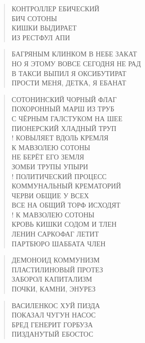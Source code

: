 \poemtitle{***}
\begin{verse}
КОНТРОЛЛЕР ЕБИЧЕСКИЙ\\
БИЧ СОТОНЫ\\
КИШКИ ВЫДИРАЕТ\\
ИЗ РЕСТФУЛ АПИ
\end{verse}

\poemtitle{***}
\begin{verse}
БАГРЯНЫМ КЛИНКОМ В НЕБЕ ЗАКАТ\\
НО Я ЭТОМУ ВОВСЕ СЕГОДНЯ НЕ РАД\\
В ТАКСИ ВЫПИЛ Я ОКСИБУТИРАТ\\
ПРОСТИ МЕНЯ, ДЕТКА, Я ЕБАНАТ
\end{verse}

\poemtitle{***}
\begin{verse}
СОТОНИНСКИЙ ЧОРНЫЙ ФЛАГ\\
ПОХОРОННЫЙ МАРШ ИЗ ТРУБ\\
С ЧЁРНЫМ ГАЛСТУКОМ НА ШЕЕ\\
ПИОНЕРСКИЙ ХЛАДНЫЙ ТРУП\\!
КОВЫЛЯЕТ ВДОЛЬ КРЕМЛЯ\\
К МАВЗОЛЕЮ СОТОНЫ\\
НЕ БЕРЁТ ЕГО ЗЕМЛЯ\\
ЗОМБИ ТРУПЫ УПЫРИ\\!
ПОЛИТИЧЕСКИЙ ПРОЦЕСС\\
КОММУНАЛЬНЫЙ КРЕМАТОРИЙ\\
ЧЕРВИ ОБЩИЕ У ВСЕХ\\
ВСЕ НА ОБЩИЙ ТОРФ ИСХОДЯТ\\!
К МАВЗОЛЕЮ СОТОНЫ\\
КРОВЬ КИШКИ СОДОМ И ТЛЕН\\
ЛЕНИН САРКОФАГ ЛЕТИТ\\
ПАРТБЮРО ШАББАТА ЧЛЕН
\end{verse}

\poemtitle{***}
\begin{verse}
ДЕМОНОИД КОММУНИЗМ\\
ПЛАСТИЛИНОВЫЙ ПРОТЕЗ\\
ЗАБОРОЛ  КАПИТАЛИЗМ\\
ПОЧКИ, КАМНИ, ЭНУРЕЗ
\end{verse}

\poemtitle{***}
\begin{verse}
ВАСИЛЕНКОС ХУЙ ПИЗДА\\
ПОКАЗАЛ ЧУГУН НАСОС\\
БРЕД ГЕНЕРИТ ГОРБУЗА\\
ПИЗДАНУТЫЙ ЕБОСТОС
\end{verse}

